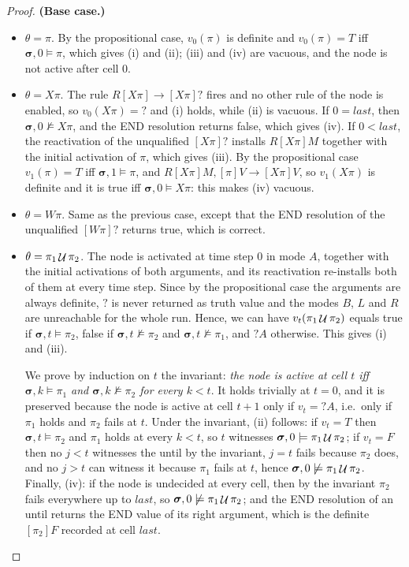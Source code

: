 \begin{proof}
\noindent
\textbf{(Base case.)}

\begin{itemize}
    \item $\theta=\pi$. By the propositional case, $v_0(\pi)$ is definite and $v_0(\pi)=T$ iff $\boldsymbol{\sigma},0\models\pi$, which gives (i) and (ii); (iii) and (iv) are vacuous, and the node is not active after cell $0$.
    \item $\theta=X\pi$. The rule $R[X\pi]\rightarrow[X\pi]?$ fires and no other rule of the node is enabled, so $v_0(X\pi)={?}$ and (i) holds, while (ii) is vacuous. If $0=last$, then $\boldsymbol{\sigma},0\not\models X\pi$, and the END resolution returns false, which gives (iv). If $0<last$, the reactivation of the unqualified $[X\pi]?$ installs $R[X\pi]M$ together with the initial activation of $\pi$, which gives (iii). By the propositional case $v_1(\pi)=T$ iff $\boldsymbol{\sigma},1\models\pi$, and $R[X\pi]M,[\pi]V\rightarrow[X\pi]V$, so $v_1(X\pi)$ is definite and it is true iff $\boldsymbol{\sigma},0\models X\pi$: this makes (iv) vacuous.
    \item $\theta=W\pi$. Same as the previous case, except that the END resolution of the unqualified $[W\pi]?$ returns true, which is correct.
    \item $\theta=\pi_1\mathop{{\mathcal{U}}}\pi_2$. The node is activated at time step $0$ in mode $A$, together with the initial activations of both arguments, and its reactivation re-installs both of them at every time step. Since by the propositional case the arguments are always definite, $?$ is never returned as truth value and the modes $B$, $L$ and $R$ are unreachable for the whole run. Hence, we can have
    $v_t(\pi_1\mathop{{\mathcal{U}}}\pi_2)$ equals true if $\boldsymbol{\sigma},t\models\pi_2$, false if $\boldsymbol{\sigma},t\not\models\pi_2$ and $\boldsymbol{\sigma},t\not\models\pi_1$, and $?A$ otherwise. This gives (i) and (iii).

    We prove by induction on $t$ the invariant: \emph{the node is active at cell $t$ iff $\boldsymbol{\sigma},k\models\pi_1$ and $\boldsymbol{\sigma},k\not\models\pi_2$ for every $k<t$}. It holds trivially at $t=0$, and it is preserved because the node is active at cell $t+1$ only if $v_t={?A}$, i.e.\ only if $\pi_1$ holds and $\pi_2$ fails at $t$. Under the invariant, (ii) follows: if $v_t=T$ then $\boldsymbol{\sigma},t\models\pi_2$ and $\pi_1$ holds at every $k<t$, so $t$ witnesses $\boldsymbol{\sigma},0\models\pi_1\mathop{{\mathcal{U}}}\pi_2$; if $v_t=F$ then no $j<t$ witnesses the until by the invariant, $j=t$ fails because $\pi_2$ does, and no $j>t$ can witness it because $\pi_1$ fails at $t$, hence $\boldsymbol{\sigma},0\not\models\pi_1\mathop{{\mathcal{U}}}\pi_2$. Finally, (iv): if the node is undecided at every cell, then by the invariant $\pi_2$ fails everywhere up to $last$, so $\boldsymbol{\sigma},0\not\models\pi_1\mathop{{\mathcal{U}}}\pi_2$; and the END resolution of an until returns the END value of its right argument, which is the definite $[\pi_2]F$ recorded at cell $last$.
\end{itemize}


\end{proof}
